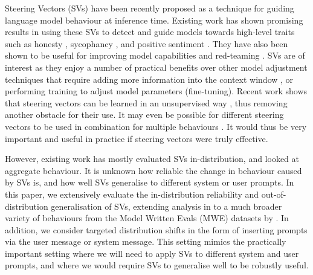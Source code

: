 \documentclass{article}
\begin{document}
Steering Vectors (SVs) \citep{rimskySteeringLlamaContrastive2023,turnerActivationAdditionSteering2023,zouRepresentationEngineeringTopDown2023,liuIncontextVectorsMaking2024} have been recently proposed as a technique for guiding language model behaviour at inference time. Existing work has shown promising results in using these SVs to detect and guide models towards high-level traits such as honesty \citep{zouRepresentationEngineeringTopDown2023}, sycophancy \citep{rimskySteeringLlamaContrastive2023}, and positive sentiment \citep{tiggesLinearRepresentationsSentiment2023}. They have also been shown to be useful for improving model capabilities \citep{wuReFTRepresentationFinetuning2024, liuIncontextVectorsMaking2024, vanderweij2024extending} and red-teaming \citep{rimsky2023redteaming}. SVs are of interest as they enjoy a number of practical benefits over other model adjustment techniques that require adding more information into the context window \citep[In-Context Learning]{brownLanguageModelsAre2020,weiChainofThoughtPromptingElicits2023}, or performing training to adjust model parameters (fine-tuning).  Recent work shows that steering vectors can be learned in an unsupervised way \citep{mack2024latentsteering}, thus removing another obstacle for their use. It may even be possible for different steering vectors to be used in combination for multiple behaviours \citep{vanderweij2024extending, wangConceptAlgebraScoreBased2023}. It would thus be very important and useful in practice if steering vectors were truly effective. %


However, existing work has mostly evaluated SVs in-distribution, and looked at aggregate behaviour. It is unknown how reliable the change in behaviour caused by SVs is, and how well SVs generalise to different system or user prompts. In this paper, we extensively evaluate the in-distribution reliability and out-of-distribution generalisation of SVs, extending analysis in \citet{rimskySteeringLlamaContrastive2023} to a much broader variety of behaviours from the Model Written Evals (MWE) datasets by \citet{perezDiscoveringLanguageModel2022a}. In addition, we consider targeted distribution shifts in the form of inserting prompts via the user message or system message. This setting mimics the practically important setting where we will need to apply SVs to different system and user prompts, and where we would require SVs to generalise well to be robustly useful.
\end{document}
